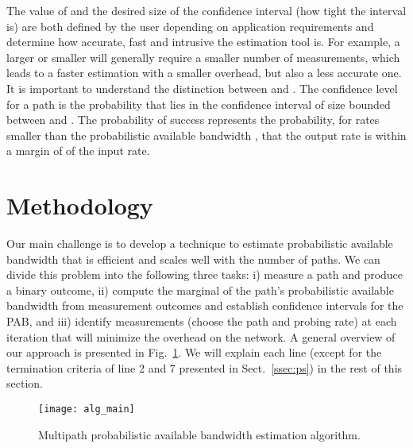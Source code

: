 \documentclass[final,5p,times,twocolumn]{elsarticle}
\begin{document}
The value of  and the desired size of the confidence interval  (how tight the interval is) are both defined by the user depending on application requirements and determine how accurate, fast and intrusive the estimation tool is.  For example, a larger  or smaller  will generally require a smaller number of measurements, which leads to a faster estimation with a smaller overhead, but also a less accurate one.  It is important to understand the distinction between  and .  The confidence level for a path  is the probability that  lies in the confidence interval of size  bounded between  and .  The probability of success  represents the probability, for rates smaller than the probabilistic available bandwidth , that the output rate is within a margin of  of the input rate.

\section{Methodology}
\label{sec:meth}

Our main challenge is to develop a technique to estimate probabilistic available bandwidth that is efficient and scales well with the number of paths.  
We can divide this problem into the following three tasks: i) measure a path and produce a binary outcome, ii) compute the marginal of the path's probabilistic available bandwidth from measurement outcomes and establish confidence intervals for the PAB, and iii) identify  measurements (choose the path and probing rate) at each iteration that will minimize the overhead on the network.  A general overview of our approach is presented in Fig.~\ref{fig:alg_main}.  We will explain each line (except for the termination criteria of line 2 and 7 presented in Sect.~\ref{ssec:ps}) in the rest of this section. 

\begin{figure}[!h]
	\centering
	\texttt{[image: alg\_main]}
	\caption{Multipath probabilistic available bandwidth estimation algorithm.\label{fig:alg_main}}
\end{figure}
\end{document}
